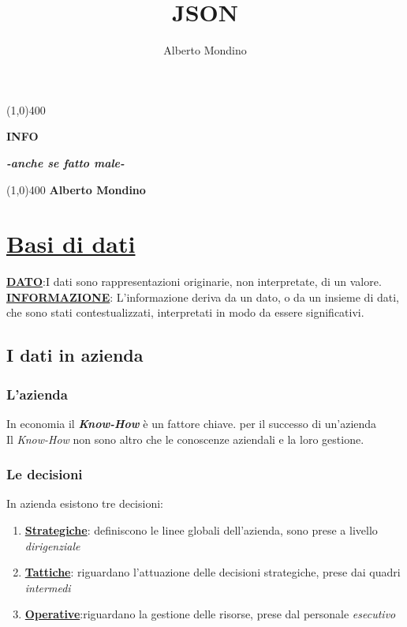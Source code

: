 \documentclass{article}
\title{JSON}\fancyfoot[]{}
\author{Alberto Mondino}
\begin{document}
\begin{titlepage}
\begin{center}
\vspace*{1cm}

\vfill
\line(1,0){400}


\Huge\textbf{INFO}

\normalsize\textbf{\textit{-anche se fatto male-}}

\line(1,0){400}
\vfill
\textbf{Alberto Mondino}


\end{center}
\end{titlepage}

\tableofcontents

\newpage
\section{\underline{Basi di dati}}

\textbf{\underline{DATO}}:I dati sono rappresentazioni originarie, non
interpretate, di un valore.
\\ \textbf{\underline{INFORMAZIONE}}:
L’informazione deriva da un dato, o da un insieme di dati, che sono
stati contestualizzati, interpretati in modo da essere significativi.
\subsection{I dati in azienda}
\subsubsection{L'azienda}
In economia il \textit{\textbf{Know-How}} è un fattore chiave. per il successo di un'azienda \\ Il \textit{Know-How} non sono altro che le conoscenze aziendali e la loro gestione.
\subsubsection{Le decisioni}
In azienda esistono tre decisioni:
\begin{enumerate}
    \item \textbf{\underline{Strategiche}}: definiscono le linee globali dell'azienda, sono prese a livello \textit{dirigenziale}
    
    \item \textbf{\underline{Tattiche}}: riguardano l'attuazione delle decisioni strategiche, prese dai quadri \textit{intermedi }
    \item\textbf{\underline{Operative}}:riguardano la gestione delle risorse, prese dal personale \textit{esecutivo}
\end{enumerate}
\end{document}
